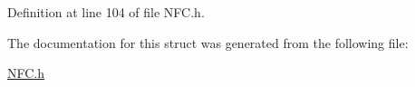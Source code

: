 Definition at line 104 of file N\-F\-C.\-h.



The documentation for this struct was generated from the following file\-:\begin{DoxyCompactItemize}
\item 
\hyperlink{NFC_8h}{N\-F\-C.\-h}\end{DoxyCompactItemize}
